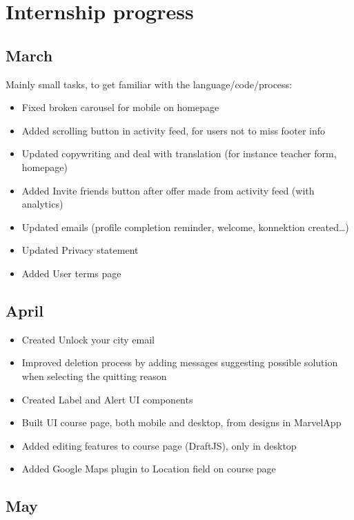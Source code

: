 \section{Internship progress}
\label{sec:internship}

\subsection{March}
\label{ssec:march}

Mainly small tasks, to get familiar with the language/code/process:
\begin{itemize}
\item Fixed broken carousel for mobile on homepage
\item Added scrolling button in activity feed, for users not to miss footer info
\item Updated copywriting and deal with translation (for instance teacher form,
homepage)
\item Added \guillemotleft Invite friends \guillemotright button after offer
made from activity feed (with analytics)
\item Updated emails (profile completion reminder, welcome, konnektion
created\ldots)
\item Updated Privacy statement
\item Added User terms page
\end{itemize}

\subsection{April}
\label{ssec:april}

\begin{itemize}
\item Created \guillemotleft Unlock your city \guillemotright email
\item Improved deletion process by adding messages suggesting possible solution
when selecting the quitting reason
\item Created Label and Alert UI components
\item Built UI course page, both mobile and desktop, from designs in MarvelApp
\item Added editing features to course page (DraftJS), only in desktop
\item Added Google Maps plugin to \guillemotleft Location \guillemotright field
on course page
\end{itemize}

\subsection{May}
\label{ssec:may}

